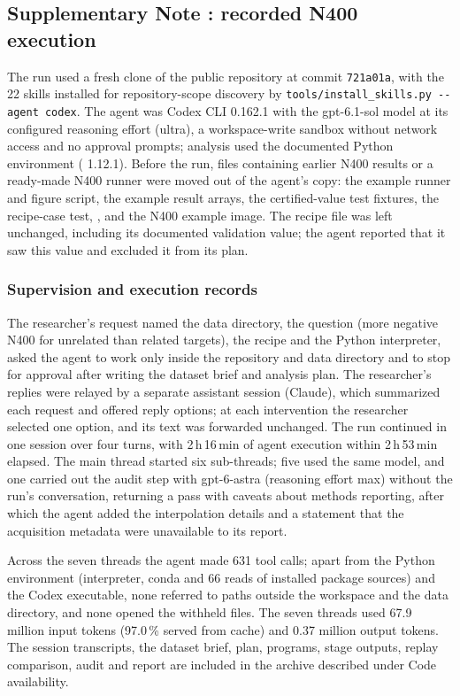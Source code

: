 \subsection*{Supplementary Note \thesuppnote: recorded N400 execution}
\label{si:recorded}

The run used a fresh clone of the public repository at commit \texttt{721a01a}, with the 22 skills installed for repository-scope discovery by \verb|tools/install_skills.py --agent codex|. The agent was Codex CLI 0.162.1 with the gpt-6.1-sol model at its configured reasoning effort (ultra), a workspace-write sandbox without network access and no approval prompts; analysis used the documented Python environment (\mne{} 1.12.1). Before the run, files containing earlier N400 results or a ready-made N400 runner were moved out of the agent's copy: the example runner and figure script, the example result arrays, the certified-value test fixtures, the recipe-case test, ,  and the N400 example image. The recipe file was left unchanged, including its documented validation value; the agent reported that it saw this value and excluded it from its plan.

\subsubsection*{Supervision and execution records}

The researcher's request named the data directory, the question (more negative N400 for unrelated than related targets), the recipe and the Python interpreter, asked the agent to work only inside the repository and data directory and to stop for approval after writing the dataset brief and analysis plan. The researcher's replies were relayed by a separate assistant session (Claude), which summarized each request and offered reply options; at each intervention the researcher selected one option, and its text was forwarded unchanged. The run continued in one session over four turns, with 2\,h\,16\,min of agent execution within 2\,h\,53\,min elapsed. The main thread started six sub-threads; five used the same model, and one carried out the audit step with gpt-6-astra (reasoning effort max) without the run's conversation, returning a pass with caveats about methods reporting, after which the agent added the interpolation details and a statement that the acquisition metadata were unavailable to its report.

Across the seven threads the agent made 631 tool calls; apart from the Python environment (interpreter, conda and 66 reads of installed package sources) and the Codex executable, none referred to paths outside the workspace and the data directory, and none opened the withheld files. The seven threads used 67.9 million input tokens (97.0\,\% served from cache) and 0.37 million output tokens. The session transcripts, the dataset brief, plan, programs, stage outputs, replay comparison, audit and report are included in the archive described under Code availability.

